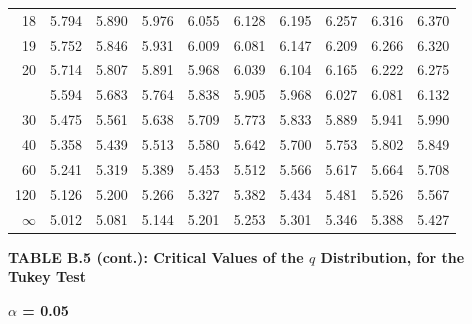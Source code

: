 \documentclass[10pt]{article}
\begin{document}
\begin{longtable}{@{}r!{\vrule width 0.8pt\hspace{0.55em}}rrrrrrrrr@{}}
18 & 5.794 & 5.890 & 5.976 & 6.055 & 6.128 & 6.195 & 6.257 & 6.316 & 6.370 \\
19 & 5.752 & 5.846 & 5.931 & 6.009 & 6.081 & 6.147 & 6.209 & 6.266 & 6.320 \\
20 & 5.714 & 5.807 & 5.891 & 5.968 & 6.039 & 6.104 & 6.165 & 6.222 & 6.275 \\
 & 5.594 & 5.683 & 5.764 & 5.838 & 5.905 & 5.968 & 6.027 & 6.081 & 6.132 \\
30 & 5.475 & 5.561 & 5.638 & 5.709 & 5.773 & 5.833 & 5.889 & 5.941 & 5.990 \\
40 & 5.358 & 5.439 & 5.513 & 5.580 & 5.642 & 5.700 & 5.753 & 5.802 & 5.849 \\
60 & 5.241 & 5.319 & 5.389 & 5.453 & 5.512 & 5.566 & 5.617 & 5.664 & 5.708 \\
120 & 5.126 & 5.200 & 5.266 & 5.327 & 5.382 & 5.434 & 5.481 & 5.526 & 5.567 \\
\addlinespace[0.30em]
$\infty$ & 5.012 & 5.081 & 5.144 & 5.201 & 5.253 & 5.301 & 5.346 & 5.388 & 5.427 \\
\end{longtable}
\newpage
\thispagestyle{empty}
\begin{center}
{\large\bfseries TABLE B.5 (cont.): Critical Values of the $q$ Distribution, for the Tukey Test\par}
\end{center}
{\large\bfseries $\alpha$ = 0.05\par}
\vspace{0.45em}
\small
\end{document}
